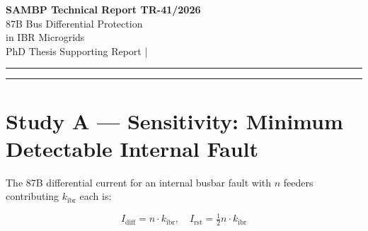 \documentclass[11pt,a4paper]{article}
\begin{document}
\begin{center}
  {\LARGE\bfseries\color{sambpblue} SAMBP Technical Report TR-41/2026}\\[6pt]
  {\large 87B Bus Differential Protection\\
    in IBR Microgrids}\\[10pt]
  {\normalsize PhD Thesis Supporting Report \quad|}
\end{center}

\vspace{2pt}\hrule\vspace{8pt}

\begin{abstract}
\noindent
This report extends the 87B bus differential scheme developed in TR-04
\cite{SAMBP_TR04} to IBR microgrids, where all feeders contribute inverter-limited
fault current.  The scheme uses a two-slope percentage differential characteristic
($k_1=30\%$, $k_2=60\%$, $I_\mathrm{diff,min}=0.10$\,pu) optimised for the
reduced fault current environment.  The minimum detectable internal fault is
$k_\mathrm{ibr}=0.1176$\,pu (slightly higher than the 87L line differential
threshold of 0.06\,pu due to the slope constraint, but adequate for microgrids
with $k_\mathrm{ibr}\geq0.20$).  CT saturation is not a concern at IBR fault
levels (25$\times$ lower than SG).  The security margin for the maximum
external through-current is 0.548\,pu.  For a two-bus microgrid with a
bus-coupler, 87B-A correctly identifies a Bus~A fault and blocks 87B-B
(which sees an external fault).  Bus~B continues in service after the trip.
\end{abstract}

\vspace{4pt}\hrule\vspace{10pt}

\section{Study A --- Sensitivity: Minimum Detectable Internal Fault}
\label{sec:studyA}

The 87B differential current for an internal busbar fault with $n$ feeders
contributing $k_\mathrm{ibr}$ each is:

\begin{equation}
  I_\mathrm{diff} = n \cdot k_\mathrm{ibr},
  \quad
  I_\mathrm{rst} = \tfrac{1}{2} n \cdot k_\mathrm{ibr}
\end{equation}
\end{document}
